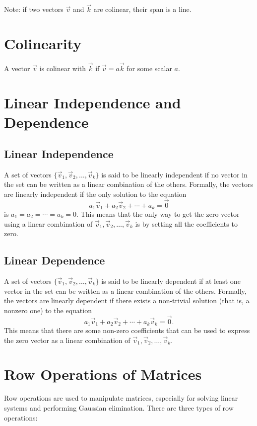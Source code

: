 \documentclass[12pt]{article}
\begin{document}
Note: if two vectors \(\vec{v}\) and \(\vec{k}\) are colinear, their span is a line.

\section{Colinearity}

A vector \(\vec{v}\) is colinear with \(\vec{k}\) if \(\vec{v}=a\vec{k}\) for some scalar \(a\).

\section{Linear Independence and Dependence}

\subsection{Linear Independence}
A set of vectors \(\{\vec{v}_1, \vec{v}_2, \ldots, \vec{v}_k\}\) is said to be linearly independent if no vector in the set can be written as a linear combination of the others. Formally, the vectors are linearly independent if the only solution to the equation
\[
a_1 \vec{v}_1 + a_2 \vec{v}_2 + \cdots + a_k = \vec{0}
\]
is \(a_1 = a_2 = \cdots = a_k = 0\). This means that the only way to get the zero vector using a linear combination of \(\vec{v}_1, \vec{v}_2, \ldots, \vec{v}_k\) is by setting all the coefficients to zero.

\subsection{Linear Dependence}
A set of vectors \(\{\vec{v}_1, \vec{v}_2, \ldots, \vec{v}_k\}\) is said to be linearly dependent if at least one vector in the set can be written as a linear combination of the others. Formally, the vectors are linearly dependent if there exists a non-trivial solution (that is, a nonzero one) to the equation
\[
a_1 \vec{v}_1 + a_2 \vec{v}_2 + \cdots + a_k \vec{v}_k = \vec{0}.
\]
This means that there are some non-zero coefficients that can be used to express the zero vector as a linear combination of \(\vec{v}_1, \vec{v}_2, \ldots, \vec{v}_k\).

\section{Row Operations of Matrices}

Row operations are used to manipulate matrices, especially for solving linear systems and performing Gaussian elimination. There are three types of row operations:
\end{document}
